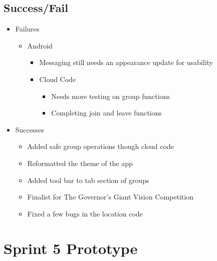 \subsection{Success/Fail}
\begin{itemize}
	\item Failures
	\begin{itemize}
		\item Android
		\begin{itemize}
			\item Messaging still needs an appearance update for usability
		\end{itemize}
		\begin{itemize}
			\item Cloud Code
			\begin{itemize}	
				\item Needs more testing on group functions
				\item Completing join and leave functions
			\end{itemize}
		\end{itemize}
	\end{itemize}
	\item Successes
	\begin{itemize}
		\item Added safe group operations though cloud code
		\item Reformatted the theme of the app
		\item Added tool bar to tab section of groups
		\item Finalist for The Governor's Giant Vision Competition
		\item Fixed a few bugs in the location code
	\end{itemize}
\end{itemize}


\section{Sprint 5 Prototype}
